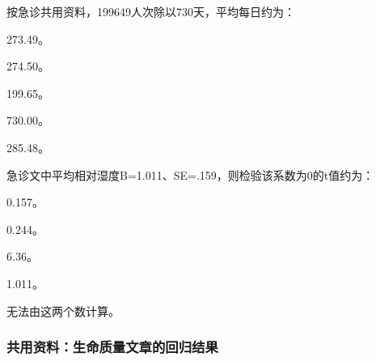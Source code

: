 \par\addvspace{6pt}\noindent\begin{minipage}{\linewidth}


按急诊共用资料，199649人次除以730天，平均每日约为：


\begin{choices}

\item 273.49。

\item 274.50。

\item 199.65。

\item 730.00。

\item 285.48。

\end{choices}

\end{minipage}\par\vspace{4pt}

\par\addvspace{6pt}\noindent\begin{minipage}{\linewidth}


急诊文中平均相对湿度B=1.011、SE=.159，则检验该系数为0的t值约为：


\begin{choices}

\item 0.157。

\item 0.244。

\item 6.36。

\item 1.011。

\item 无法由这两个数计算。

\end{choices}

\end{minipage}\par\vspace{4pt}

\subsubsection*{共用资料：生命质量文章的回归结果}


